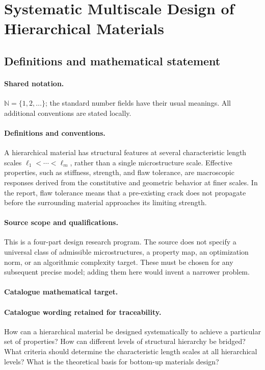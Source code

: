 \documentclass[11pt]{article}
\begin{document}
\section{Systematic Multiscale Design of Hierarchical Materials}\label{statement}

\subsection{Definitions and mathematical statement}

\paragraph{Shared notation.}$\mathbb N=\{1,2,\ldots\}$; the standard number fields have their usual meanings. All additional conventions are stated locally.


\paragraph{Definitions and conventions.} A hierarchical material has structural features at several characteristic length scales $\ell_1<\cdots<\ell_m$, rather than a single microstructure scale. Effective properties, such as stiffness, strength, and flaw tolerance, are macroscopic responses derived from the constitutive and geometric behavior at finer scales. In the report, flaw tolerance means that a pre-existing crack does not propagate before the surrounding material approaches its limiting strength.

\paragraph{Source scope and qualifications.} This is a four-part design research program. The source does not specify a universal class of admissible microstructures, a property map, an optimization norm, or an algorithmic complexity target. These must be chosen for any subsequent precise model; adding them here would invent a narrower problem.

\paragraph{Catalogue mathematical target.}
\paragraph{Catalogue wording retained for traceability.}
How can a hierarchical material be designed systematically to achieve a particular set of properties? How can different levels of structural hierarchy be bridged? What criteria should determine the characteristic length scales at all hierarchical levels? What is the theoretical basis for bottom-up materials design?
\end{document}
